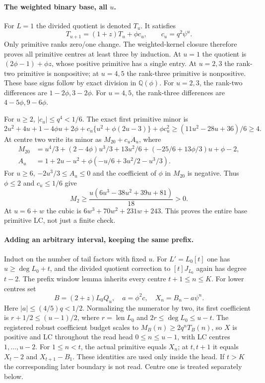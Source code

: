 \paragraph{The weighted binary base, all $u$.}
For $L=1$ the divided quotient is denoted $T_u$. It satisfies
\[
 T_{u+1}=(1+z)T_u+\phi c_u,\qquad c_u=q^2\psi^u.
\]
Only primitive ranks zero/one change. The weighted-kernel closure
therefore proves all primitive centres at least three by induction.
At $u=1$ the quotient is $(2\phi-1)+\phi z$, whose positive
primitive has a single entry. At $u=2,3$ the rank-two primitive
is nonpositive; at $u=4,5$ the rank-three primitive is nonpositive.
These base signs follow by exact division in $\mathbb Q(\phi)$.
For $u=2,3$, the rank-two differences are $1-2\phi,3-2\phi$.
For $u=4,5$, the rank-three differences are $4-5\phi,9-6\phi$.

For $u\ge2$, $|c_u|\le q^4<1/6$. The exact first primitive
minor is
\[
 2u^2+4u+1-4\phi u+2\phi
       +c_u\{u^2+\phi(2u-3)\}+\phi c_u^2
 \ge(11u^2-28u+36)/6\ge4.
\]
At centre two write its minor as $M_{20}+c_u A_u$, where
\[
\begin{aligned}
 M_{20}&=u^4/3+(2-4\phi)u^3/3+13u^2/6
                         +(-25/6+13\phi/3)u+\phi-2,\\
 A_u&=1+2u-u^2+\phi(-u/6+3u^2/2-u^3/3).
\end{aligned}
\]
For $u\ge6$, $-2u^3/3\le A_u\le0$ and the coefficient of
$\phi$ in $M_{20}$ is negative. Thus $\phi\le2$ and $c_u\le1/6$
give
\[
 M_2\ge\frac{u(6u^3-38u^2+39u+81)}{18}>0.
\]
At $u=6+w$ the cubic is $6w^3+70w^2+231w+243$.
This proves the entire base primitive LC, not just a finite check.

\paragraph{Adding an arbitrary interval, keeping the same prefix.}
Induct on the number of tail factors with fixed $u$.
For $L'=L_0[t]$ one has $u\ge\deg L_0+t$, and the divided
quotient correction to $[t]J_{L_0}$ again has degree $t-2$.
The prefix window lemma inherits every centre $t+1\le n\le K$.
For lower centres set
\[
 B=(2+z)L_0Q_u,\quad a=\phi^2c,\quad X_n=B_n-a\psi^n.
\]
Here $|a|\le(4/5)q<1/2$. Normalizing the numerator by two,
its first coefficient is $r+1/2\le(u-1)/2$, where
$r=\operatorname{len}L_0$ and $2r\le\deg L_0\le u-t$.
The registered robust coefficient budget scales to
$M_B(n)\ge2q^nT_B(n)$, so $X$ is positive and LC throughout
the read head $0\le n\le u-1$, with LC centres $1,\ldots,u-2$.
For $1\le n<t$, the actual primitive equals $X_n$; at $t,t+1$
it equals $X_t-2$ and $X_{t+1}-B_1$. These identities are used
only inside the head. If $t>K$ the corresponding later boundary
is not read. Centre one is treated separately below.

